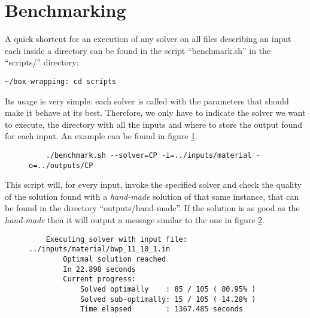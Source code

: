 \section{Benchmarking}
\label{sec:benchmarking}

A quick shortcut for an execution of any solver on all files describing
an input each inside a directory can be found in the script ``benchmark.sh''
in the ``scripts/'' directory:
\begin{verbatim}
~/box-wrapping: cd scripts
\end{verbatim}

Its usage is very simple: each solver is called with the parameters that
should make it behave at its best. Therefore, we only have to indicate the solver
we want to execute, the directory with all the inputs and where to store the
output found for each input. An example can be found in figure \ref{fig:benchmark-example}.

\begin{figure}[H]
\centering
\begin{verbatim}
	./benchmark.sh --solver=CP -i=../inputs/material -o=../outputs/CP
\end{verbatim}
\label{fig:benchmark-example}
\end{figure}

This script will, for every input, invoke the specified solver and check the
quality of the solution found with a \textit{hand-made} solution of that same
instance, that can be found in the directory ``outputs/hand-made''. If the
solution is as good as the \textit{hand-made} then it will output a message
similar to the one in figure \ref{fig:benchmark-verbose:optimal}.

\begin{figure}[H]
\centering
\begin{verbatim}
	Executing solver with input file: ../inputs/material/bwp_11_10_1.in
		Optimal solution reached
		In 22.898 seconds
		Current progress:
			Solved optimally    : 85 / 105 ( 80.95% )
			Solved sub-optimally: 15 / 105 ( 14.28% )
			Time elapsed        : 1367.485 seconds
\end{verbatim}
\label{fig:benchmark-verbose:optimal}
\end{figure}

